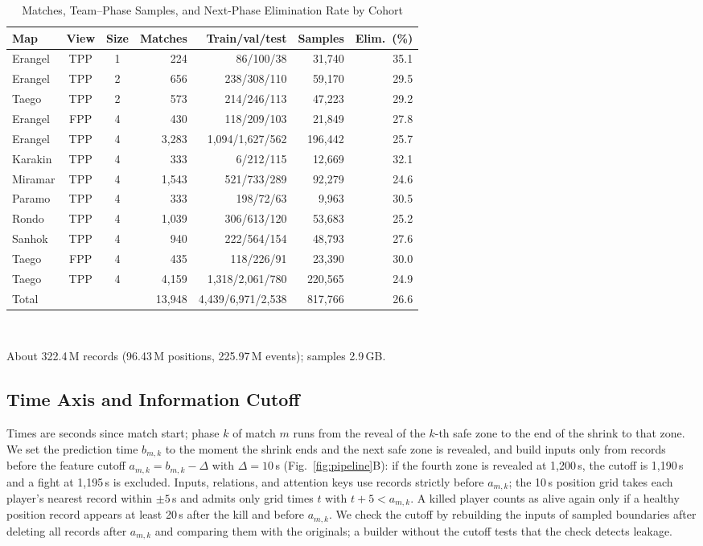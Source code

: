 \documentclass[sigconf,anonymous,nonacm]{acmart}
\begin{document}
\begin{table}[t]
\centering
\caption{Matches, Team--Phase Samples, and Next-Phase Elimination Rate by Cohort}
\label{tab:cohorts}
\footnotesize
\setlength{\tabcolsep}{2.7pt}
\begin{tabular}{lccrrrr}
\hline
Map & View & Size & Matches & Train/val/test & Samples & Elim.\ (\%) \\
\hline
Erangel & TPP & 1 & 224 & 86/100/38 & 31,740 & 35.1 \\
Erangel & TPP & 2 & 656 & 238/308/110 & 59,170 & 29.5 \\
Taego & TPP & 2 & 573 & 214/246/113 & 47,223 & 29.2 \\
Erangel & FPP & 4 & 430 & 118/209/103 & 21,849 & 27.8 \\
Erangel & TPP & 4 & 3,283 & 1,094/1,627/562 & 196,442 & 25.7 \\
Karakin & TPP & 4 & 333 & 6/212/115 & 12,669 & 32.1 \\
Miramar & TPP & 4 & 1,543 & 521/733/289 & 92,279 & 24.6 \\
Paramo & TPP & 4 & 333 & 198/72/63 & 9,963 & 30.5 \\
Rondo & TPP & 4 & 1,039 & 306/613/120 & 53,683 & 25.2 \\
Sanhok & TPP & 4 & 940 & 222/564/154 & 48,793 & 27.6 \\
Taego & FPP & 4 & 435 & 118/226/91 & 23,390 & 30.0 \\
Taego & TPP & 4 & 4,159 & 1,318/2,061/780 & 220,565 & 24.9 \\
\hline
Total & & & 13,948 & 4,439/6,971/2,538 & 817,766 & 26.6 \\
\hline
\end{tabular}
\\[2pt]
\parbox{\columnwidth}{\scriptsize About 322.4\,M records (96.43\,M positions, 225.97\,M events); samples 2.9\,GB.}
\end{table}

\subsection{Time Axis and Information Cutoff}
\label{sec:method:samples}
Times are seconds since match start; phase $k$ of match $m$ runs from the reveal of the $k$-th safe zone to the end of the shrink to that zone.
We set the prediction time $b_{m,k}$ to the moment the shrink ends and the next safe zone is revealed, and build inputs only from records before the feature cutoff $a_{m,k}=b_{m,k}-\Delta$ with $\Delta=10$\,s (Fig.~\ref{fig:pipeline}B): if the fourth zone is revealed at 1,200\,s, the cutoff is 1,190\,s and a fight at 1,195\,s is excluded. Inputs, relations, and attention keys use records strictly before $a_{m,k}$; the 10\,s position grid takes each player's nearest record within $\pm5$\,s and admits only grid times $t$ with $t+5<a_{m,k}$.
A killed player counts as alive again only if a healthy position record appears at least 20\,s after the kill and before $a_{m,k}$.
We check the cutoff by rebuilding the inputs of sampled boundaries after deleting all records after $a_{m,k}$ and comparing them with the originals; a builder without the cutoff tests that the check detects leakage.
\end{document}
